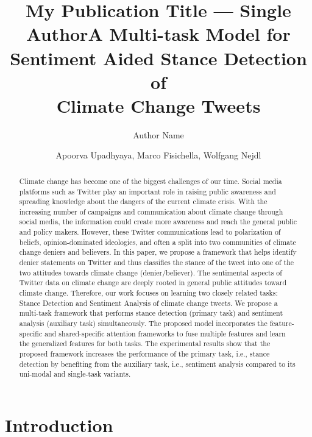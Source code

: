 \documentclass[letterpaper]{article} %
\title{My Publication Title --- Single Author}
\author {
    Author Name \\
}
\author {
    Apoorva Upadhyaya,
    Marco Fisichella,
    Wolfgang Nejdl \\
}
\title{A Multi-task Model for Sentiment Aided Stance Detection of \\Climate Change Tweets}
\begin{document}
\maketitle

\begin{abstract}
Climate change has become one of the biggest challenges of our time. Social media platforms such as Twitter play an important role in raising public awareness and spreading knowledge about the dangers of the current climate crisis. With the increasing number of campaigns and communication about climate change through social media, the information could create more awareness and reach the general public and policy makers. However, these Twitter communications lead to polarization of beliefs, opinion-dominated ideologies, and often a split into two communities of climate change deniers and believers. In this paper, we propose a framework that helps identify denier statements on Twitter and thus classifies the stance of the tweet into one of the two attitudes towards climate change (denier/believer). The sentimental aspects of Twitter data on climate change are deeply rooted in general public attitudes toward climate change. Therefore, our work focuses on learning two closely related tasks: Stance Detection and Sentiment Analysis of climate change tweets. We propose a multi-task framework that performs stance detection (primary task) and sentiment analysis (auxiliary task) simultaneously. The proposed model incorporates the feature-specific and shared-specific attention frameworks to fuse multiple features and learn the generalized features for both tasks. The experimental results show that the proposed framework increases the performance of the primary task, i.e., stance detection by benefiting from the auxiliary task, i.e., sentiment analysis compared to its uni-modal and single-task variants.
\end{abstract}
\section{Introduction}\label{intro}
\end{document}
